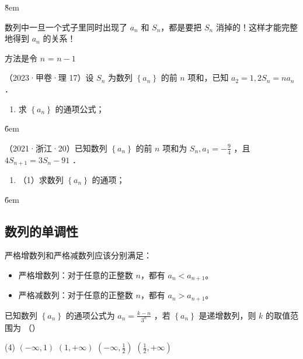 \v{8em}

\begin{warning}
    数列中一旦一个式子里同时出现了 $a_n$ 和 $S_n$，都是要把 $S_n$ 消掉的！这样才能完整地得到 $a_n$ 的关系！

    方法是令 $n$ = $n-1$
\end{warning}

\begin{example}
    （2023·甲卷·理 17）设 $S_n$ 为数列 $\left\{a_n\right\}$ 的前 $n$ 项和，已知 $a_2=1,2 S_n=n a_n$ ．
    \begin{enumerate}
        \item 求 $\left\{a_n\right\}$ 的通项公式；
    \end{enumerate}
\end{example}

\v{6em}

\begin{example}
    （2021·浙江·20）已知数列 $\left\{a_n\right\}$ 的前 $n$ 项和为 $S_n, a_1=-\frac{9}{4}$ ，且 $4 S_{n+1}=3 S_n-91$ ．
    \begin{enumerate}
        \item （1）求数列 $\left\{a_n\right\}$ 的通项；
    \end{enumerate}
\end{example}

\v{6em}

\subsection{数列的单调性}

\begin{theorem}
    严格增数列和严格减数列应该分别满足：

    \begin{itemize}
        \item 严格增数列：对于任意的正整数 $n$，都有 $a_n < a_{n+1}$。
        \item 严格减数列：对于任意的正整数 $n$，都有 $a_n > a_{n+1}$。
    \end{itemize}
\end{theorem}

\begin{example}
    已知数列 $\left\{a_n\right\}$ 的通项公式为 $a_n=\frac{k-n}{3^n}$ ，若 $\left\{a_n\right\}$ 是递增数列，则 $k$ 的取值范围为 （\qquad）
    \begin{tasks}(4)
        \task $(-\infty, 1)$
        \task $(1,+\infty)$
        \task $\left(-\infty, \frac{1}{2}\right)$
        \task $\left(\frac{1}{2},+\infty\right)$
    \end{tasks}
\end{example}

